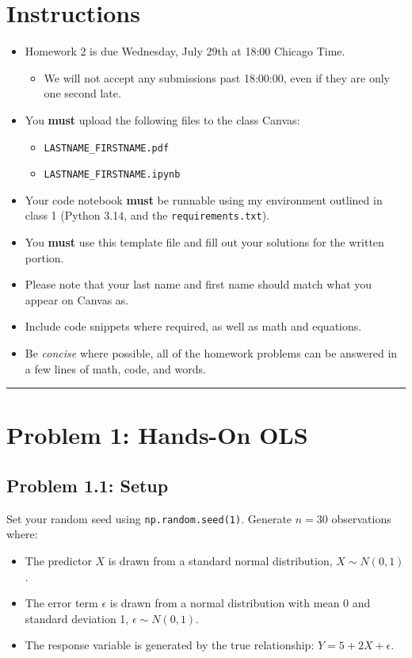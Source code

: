 \documentclass[11pt, letterpaper]{article}
\newcommand{\problem}[1]{\section*{Problem #1}}
\newcommand{\subproblem}[1]{\subsection*{Problem #1}}
\begin{document}
\section*{Instructions}
\begin{itemize}
    \item Homework 2 is due Wednesday, July 29th at 18:00 Chicago Time.
    \begin{itemize}
        \item We will not accept any submissions past 18:00:00, even if they are only one second late.
    \end{itemize}
    \item You \textbf{must} upload the following files to the class Canvas:
    \begin{itemize}
        \item \texttt{LASTNAME\_FIRSTNAME.pdf}
        \item \texttt{LASTNAME\_FIRSTNAME.ipynb}
    \end{itemize}
    \item Your code notebook \textbf{must} be runnable using my environment outlined in class 1 (Python 3.14, and the \texttt{requirements.txt}).
    \item You \textbf{must} use this template file and fill out your solutions for the written portion.
    \item Please note that your last name and first name should match what you appear on Canvas as.
    \item Include code snippets where required, as well as math and equations.
    \item Be \textit{concise} where possible, all of the homework problems can be answered in a few lines of math, code, and words.
\end{itemize}
\hrule
\vspace{0.5cm}

\pagebreak

\problem{1: Hands-On OLS}

\subproblem{1.1: Setup}

Set your random seed using \texttt{np.random.seed(1)}. Generate $n=30$ observations where:
\begin{itemize}
    \item The predictor $X$ is drawn from a standard normal distribution, $X \sim N(0, 1)$.
    \item The error term $\epsilon$ is drawn from a normal distribution with mean 0 and standard deviation 1, $\epsilon \sim N(0, 1)$.
    \item The response variable is generated by the true relationship: $Y = 5 + 2X + \epsilon$.
\end{itemize}
\end{document}
